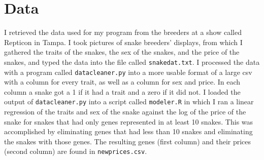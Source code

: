 \documentclass{article}
\begin{document}
	\section*{Data}
	\indent\indent I retrieved the data used for my program from the breeders at a show called Repticon in Tampa. I took pictures of snake breeders' displays, from which I gathered the traits of the snakes, the sex of the snakes, and the price of the snakes, and typed the data into the file called \texttt{snakedat.txt}. I processed the data with a program called \texttt{datacleaner.py} into a more usable format of a large csv with a column for every trait, as well as a column for sex and price. In each column a snake got a 1 if it had a trait and a zero if it did not. I loaded the output of \texttt{datacleaner.py} into a script called \texttt{modeler.R} in which I ran a linear regression of the traits and sex of the snake against the log of the price of the snake for snakes that had only genes represented in at least 10 snakes. This was accomplished by eliminating genes that had less than 10 snakes and eliminating the snakes with those genes. The resulting genes (first column) and their prices (second column) are found in \texttt{newprices.csv}.
\end{document}
